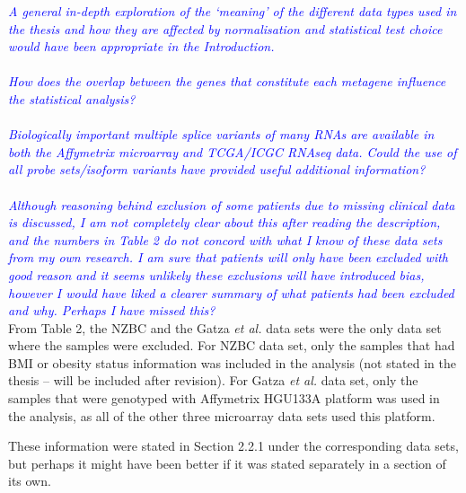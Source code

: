 \documentclass[a4paper, 12pt]{article}
\begin{document}
\noindent
\textcolor{blue}{
	\textit{A general in-depth exploration of the `meaning' of the different data types used in the thesis and how they are affected by normalisation and statistical test choice would have been appropriate in the Introduction.
	}
}\\

\noindent
\\

\noindent
\textcolor{blue}{
	\textit{How does the overlap between the genes that constitute each metagene influence the statistical analysis?
	}
}\\

\noindent
\\

\noindent
\textcolor{blue}{
	\textit{Biologically important multiple splice variants of many RNAs are available in both the Affymetrix microarray and TCGA/ICGC RNAseq data.
	Could the use of all probe sets/isoform variants have provided useful additional information?
	}
}\\

\noindent
\\

\noindent
\textcolor{blue}{
	\textit{Although reasoning behind exclusion of some patients due to missing clinical data is discussed, I am not completely clear about this after reading the description, and the numbers in Table 2 do not concord with what I know of these data sets from my own research.
	I am sure that patients will only have been excluded with good reason and it seems unlikely these exclusions will have introduced bias, however I would have liked a clearer summary of what patients had been excluded and why.
	Perhaps I have missed this?
	}
}\\

\noindent
From Table 2, the NZBC and the Gatza \textit{et al.} data sets were the only data set where the samples were excluded.
For NZBC data set, only the samples that had BMI or obesity status  information was included in the analysis (not stated in the thesis --  will be included after revision).
For Gatza \textit{et al.} data set, only the samples that were genotyped with Affymetrix HGU133A platform was used in the analysis, as all of the other three microarray data sets used this platform.

These information were stated in Section 2.2.1 under the corresponding data sets, but perhaps it might have been better if it was stated separately in a section of its own.
\\
\end{document}
